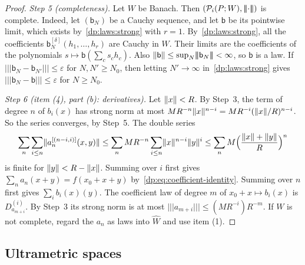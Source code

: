 \begin{proof}
\emph{Step 5 (completeness).} Let $W$ be Banach. Then $(\mathcal P_i(P;W),\lvert\!\lvert\!\lvert\cdot\rvert\!\rvert\!\rvert)$ is complete. Indeed, let $(\mathsf b_N)$ be a Cauchy sequence, and let $\mathsf b$ be its pointwise limit, which exists by~\eqref{dp:laws:strong} with $r=1$. By~\eqref{dp:laws:strong}, all the coefficients $\mathsf b_N^{[\delta]}(h_1,\dots,h_r)$ are Cauchy in $W$. Their limits are the coefficients of the polynomials $s\mapsto\mathsf b(\sum_cs_ch_c)$. Also $\lVert \mathsf b\rVert\le\sup_N\lvert\!\lvert\!\lvert\mathsf b_N\rvert\!\rvert\!\rvert<\infty$, so $\mathsf b$ is a law. If $\lvert\!\lvert\!\lvert\mathsf b_N-\mathsf b_{N'}\rvert\!\rvert\!\rvert\le\varepsilon$ for $N,N'\ge N_0$, then letting $N'\to\infty$ in~\eqref{dp:laws:strong} gives $\lvert\!\lvert\!\lvert\mathsf b_N-\mathsf b\rvert\!\rvert\!\rvert\le\varepsilon$ for $N\ge N_0$.

\emph{Step 6 (item (4), part (b): derivatives).} Let $\lVert x\rVert<R$. By Step~3, the term of degree $n$ of $b_i(x)$ has strong norm at most $MR^{-n}\lVert x\rVert^{n-i}=MR^{-i}(\lVert x\rVert/R)^{n-i}$. So the series converges, by Step~5. The double series
\[
 \sum_n\sum_{i\le n}\lVert a_n^{[(n-i,i)]}(x,y)\rVert\le\sum_nMR^{-n}\sum_{i\le n}\lVert x\rVert^{n-i}\lVert y\rVert^i\le\sum_nM\Bigl(\frac{\lVert x\rVert+\lVert y\rVert}R\Bigr)^n
\]
is finite for $\lVert y\rVert<R-\lVert x\rVert$. Summing over $i$ first gives $\sum_na_n(x+y)=f(x_0+x+y)$ by~\eqref{dp:eq:coefficient-identity}. Summing over $n$ first gives $\sum_ib_i(x)(y)$. The coefficient law of degree $m$ of $x_0+x\mapsto b_i(x)$ is $D^{(i)}_{a_{m+i}}$. By Step~3 its strong norm is at most $\lvert\!\lvert\!\lvert a_{m+i}\rvert\!\rvert\!\rvert\le(MR^{-i})R^{-m}$. If $W$ is not complete, regard the $a_n$ as laws into $\widehat W$ and use item (1).
\end{proof}

\subsection{Ultrametric spaces}

